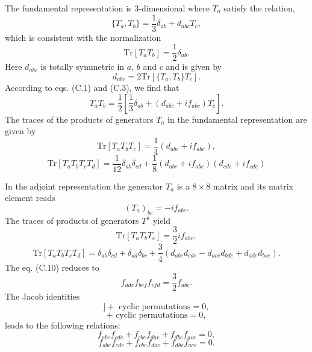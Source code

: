 The fundamental representation is 3-dimensional where $T_a$ satisfy the relation,
\begin{equation}
\{T_a,T_b\}=\frac{1}{3}\delta_{ab}+d_{abc}T_c,
\end{equation}
which is consistent with the normalization
\begin{equation}
\text{Tr}[T_aT_b]=\frac{1}{2}\delta_{ab}.
\end{equation}
Here $d_{abc}$ is totally symmetric in $a$, $b$ and $c$ and is given by
\begin{equation}
d_{abc}=2\text{Tr}[\{T_a,T_b\}T_c].
\end{equation}
According to eqs. (C.1) and (C.3), we find that
\begin{equation}
T_aT_b=\frac{1}{2}\left[\frac{1}{3}\delta_{ab}+(d_{abc}+if_{abc})T_c\right].
\end{equation}
The traces of the products of generators $T_a$ in the fundamental representation are given by
\begin{equation}
\text{Tr}[T_aT_bT_c]=\frac{1}{4}(d_{abc}+if_{abc}),
\end{equation}
\begin{equation}
\text{Tr}[T_aT_bT_cT_d]=\frac{1}{12}\delta_{ab}\delta_{cd}+\frac{1}{8}(d_{abe}+if_{abe})(d_{cde}+if_{cde})
\end{equation}

In the adjoint representation the generator $T_a$ is a $8\times 8$ matrix and its matrix element reads
\begin{equation}
(T_a)_{bc}=-if_{abc}.
\end{equation}
The traces of products of generators $T^a$ yield
\begin{equation}
\text{Tr}[T_aT_bT_c]=\frac{3}{2}if_{abc},
\end{equation}
\begin{equation}
\text{Tr}[T_aT_bT_cT_d]=\delta_{ab}\delta_{cd}+\delta_{ad}\delta_{bc}+\frac{3}{4}(d_{abe}d_{cde}-d_{ace}d_{bde}+d_{ade}d_{bce}).
\end{equation}
The eq. (C.10) reduces to
\begin{equation}
f_{ade}f_{bef}f_{cfd}=\frac{3}{2}f_{abc}.
\end{equation}
The Jacob identities 
\begin{equation}
[T_a,[T_b,T_C]]+\text{ cyclic permutations} = 0,
\end{equation}
\begin{equation}
[T_a,\{T_b,T_C\}]+\text{ cyclic permutations} = 0,
\end{equation}
leads to the following relations:
\begin{equation}
f_{abe}f_{cde}+f_{cbe}f_{dae}+f_{dbe}f_{ace}=0,
\end{equation}
\begin{equation}
f_{abe}f_{cde}+f_{cbe}f_{dae}+f_{dbe}f_{ace}=0.
\end{equation}

